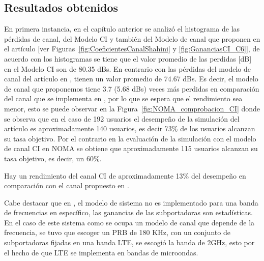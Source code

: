 \subsection{Resultados obtenidos}
En primera instancia, en el capítulo anterior se analizó el histograma de las pérdidas de canal, del Modelo CI y también del Modelo de canal que proponen en el artículo \parencite{Shahini2019} [ver Figuras~\ref{fig:CoeficientesCanalShahini} y \ref{fig:GananciasCI_C6}], de acuerdo con los histogramas se tiene que el valor promedio de las perdidas [dB] en el Modelo CI son de 80.35 dBs. En contrario con las pérdidas del modelo de canal del artículo en \parencite{Shahini2019}, tienen un valor promedio de 74.67 dBs. Es decir, el modelo de canal que proponemos tiene 3.7 (5.68 dBs) veces más perdidas en comparación del canal que se implementa en \parencite{Shahini2019}, por lo que se espera que el rendimiento sea menor, esto se puede observar en la Figura~\ref{fig:NOMA_comprobacion_CI} donde se observa que en el caso de 192 usuarios el desempeño de la simulación del artículo es aproximadamente 140 usuarios, es decir 73\% de los usuarios alcanzan su tasa objetivo. Por el contrario en la evaluación de la simulación con el modelo de canal CI en NOMA se obtiene que aproximadamente 115 usuarios alcanzan su tasa objetivo, es decir, un 60\%. \newline

Hay un rendimiento del canal CI de aproximadamente 13\% del desempeño en comparación con el canal propuesto en \parencite{Shahini2019}.\newline

Cabe destacar que en \parencite{Shahini2019}, el modelo de sistema no es implementado para una banda de frecuencias en específico, las ganancias de las subportadoras son estadísticas. En el caso de este sistema como se ocupa un modelo de canal que depende de la frecuencia, se tuvo que escoger un PRB de 180 KHz, con un conjunto de subportadoras fijadas en una banda LTE, se escogió la banda de 2GHz, esto por el hecho de que LTE se implementa en bandas de microondas. \newline

